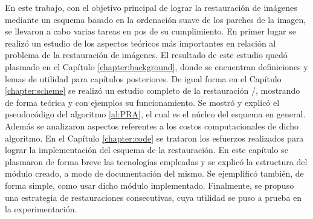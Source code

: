 \begin{conclusions}\label{chapter:conclusions}

\qquad 

En este trabajo, con el objetivo principal de lograr la restauraci\'on de im\'agenes mediante un esquema basado en la ordenaci\'on suave de los parches de la imagen, se llevaron a cabo varias tareas en pos de su cumplimiento. En primer lugar se realiz\'o un estudio de los aspectos te\'oricos m\'as importantes en relaci\'on al problema de la restauraci\'on de im\'agenes. El resultado de este estudio qued\'o plasmado en el Cap\'itulo \ref{chapter:background}, donde se encuentran definiciones y lemas de utilidad para cap\'itulos posteriores. De igual forma en el Cap\'itulo \ref{chapter:scheme} se realiz\'o un estudio completo de la restauraci\'on \SOP/, mostrando de forma te\'orica y con ejemplos su funcionamiento. Se mostr\'o y explic\'o el pseudoc\'odigo del algoritmo \ref{al:PRA}, el cual es el n\'ucleo del esquema en general. Adem\'as se analizaron aspectos referentes a los costos computacionales de dicho algoritmo. En el Cap\'itulo \ref{chapter:code} se trataron los esfuerzos realizados para lograr la implementaci\'on del esquema de la restauraci\'on. En este cap\'itulo se plasmaron de forma breve las tecnolog\'ias empleadas y se explic\'o la estructura del m\'odulo creado, a modo de documentaci\'on del mismo. Se ejemplific\'o tambi\'en, de forma simple, como usar dicho m\'odulo implementado. Finalmente, se propuso una estrategia de restauraciones consecutivas, cuya utilidad se puso a prueba en la experimentaci\'on.


\end{conclusions}
